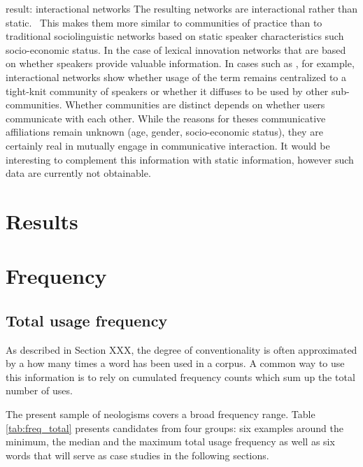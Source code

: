 \documentclass[draft, a4paper, abstract=on]{scrartcl}
\begin{document}
    result: interactional networks
      The resulting networks are interactional rather than static.~\parencite{Goel2016SocialDynamics} This makes them more similar to communities of practice than to traditional sociolinguistic networks based on static speaker characteristics such socio-economic status.
      In the case of lexical innovation networks that are based on whether speakers provide valuable information. In cases such as , for example, interactional networks show whether usage of the term remains centralized to a tight-knit community of speakers or whether it diffuses to be used by other sub-communities.
      Whether communities are distinct depends on whether users communicate with each other. While the reasons for theses communicative affiliations remain unknown (age, gender, socio-economic status), they are certainly real in mutually engage in communicative interaction.
      It would be interesting to complement this information with static information, however such data are currently not obtainable.

\section{Results}
  \section{Frequency}

    \subsection{Total usage frequency}

  As described in Section XXX, the degree of conventionality is often approximated by a how many times a word has been used in a corpus. A common way to use this information is to rely on cumulated frequency counts which sum up the total number of uses.

  The present sample of neologisms covers a broad frequency range. Table \ref{tab:freq_total} presents candidates from four groups: six examples around the minimum, the median and the maximum total usage frequency as well as six words that will serve as case studies in the following sections.
\end{document}
